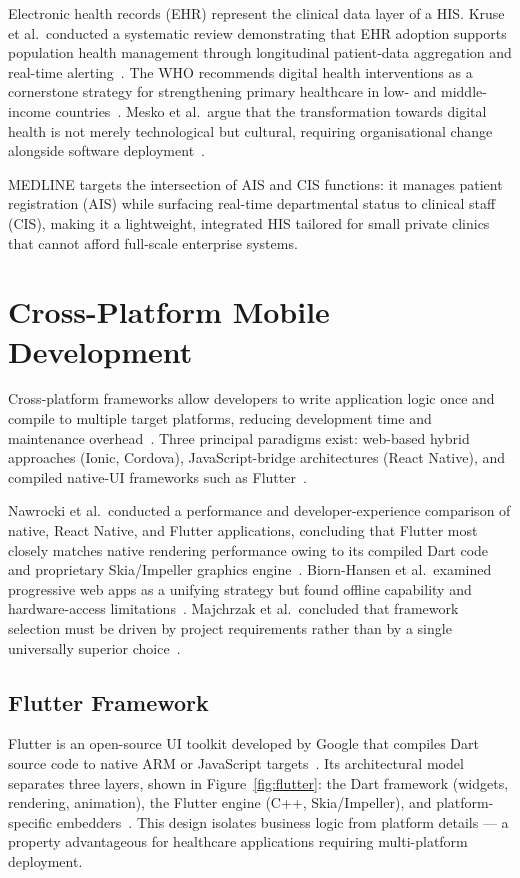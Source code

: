 \documentclass[12pt,a4paper,oneside]{report}
\begin{document}
Electronic health records (EHR) represent the clinical data layer of a HIS.
Kruse et al.\ conducted a systematic review demonstrating that EHR adoption
supports population health management through longitudinal patient-data
aggregation and real-time alerting~\cite{kruse2018}. The WHO recommends digital
health interventions as a cornerstone strategy for strengthening primary
healthcare in low- and middle-income countries~\cite{who2019}. Mesko et al.\
argue that the transformation towards digital health is not merely
technological but cultural, requiring organisational change alongside software
deployment~\cite{mesko2020}.

MEDLINE targets the intersection of AIS and CIS functions: it manages patient
registration (AIS) while surfacing real-time departmental status to clinical
staff (CIS), making it a lightweight, integrated HIS tailored for small private
clinics that cannot afford full-scale enterprise systems.

\section{Cross-Platform Mobile Development}

Cross-platform frameworks allow developers to write application logic once and
compile to multiple target platforms, reducing development time and maintenance
overhead~\cite{nawrocki2021}. Three principal paradigms exist: web-based hybrid
approaches (Ionic, Cordova), JavaScript-bridge architectures (React Native),
and compiled native-UI frameworks such as Flutter~\cite{pinto2020}.

Nawrocki et al.\ conducted a performance and developer-experience comparison of
native, React Native, and Flutter applications, concluding that Flutter most
closely matches native rendering performance owing to its compiled Dart code
and proprietary Skia/Impeller graphics engine~\cite{nawrocki2021}.
Biorn-Hansen et al.\ examined progressive web apps as a unifying strategy but
found offline capability and hardware-access limitations~\cite{biorn2020}.
Majchrzak et al.\ concluded that framework selection must be driven by project
requirements rather than by a single universally superior
choice~\cite{majchrzak2018}.

\subsection{Flutter Framework}

Flutter is an open-source UI toolkit developed by Google that compiles Dart
source code to native ARM or JavaScript targets~\cite{flutter2024}. Its
architectural model separates three layers, shown in Figure~\ref{fig:flutter}:
the Dart framework (widgets, rendering, animation), the Flutter engine (C++,
Skia/Impeller), and platform-specific embedders~\cite{flutterarch2024}. This
design isolates business logic from platform details --- a property
advantageous for healthcare applications requiring multi-platform deployment.
\end{document}
